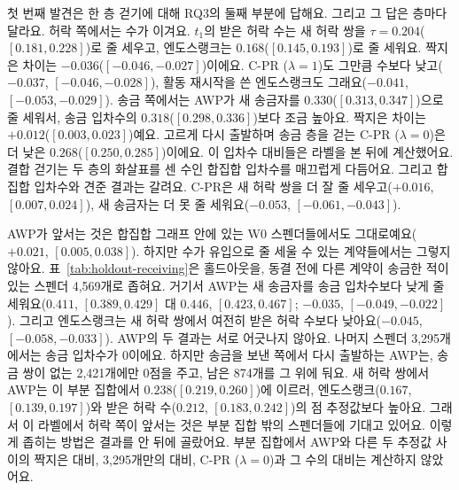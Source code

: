 첫 번째 발견은 한 층 걷기에 대해 RQ3의 둘째 부분에 답해요. 그리고 그 답은 층마다 달라요. 허락 쪽에서는 수가 이겨요. $t_1$의 받은 허락 수는 새 허락 쌍을 $\tau=0.204$($[0.181,0.228]$)로 줄 세우고, 엔도스랭크는 $0.168$($[0.145,0.193]$)로 줄 세워요. 짝지은 차이는 $-0.036$($[-0.046,-0.027]$)이에요. \mbox{C-PR} ($\lambda=1$)도 그만큼 수보다 낮고($-0.037$, $[-0.046,-0.028]$), 활동 재시작을 쓴 엔도스랭크도 그래요($-0.041$, $[-0.053,-0.029]$). 송금 쪽에서는 AWP가 새 송금자를 $0.330$($[0.313,0.347]$)으로 줄 세워서, 송금 입차수의 $0.318$($[0.298,0.336]$)보다 조금 높아요. 짝지은 차이는 $+0.012$($[0.003,0.023]$)예요. 고르게 다시 출발하며 송금 층을 걷는 \mbox{C-PR} ($\lambda=0$)은 더 낮은 $0.268$($[0.250,0.285]$)이에요. 이 입차수 대비들은 라벨을 본 뒤에 계산했어요. 결합 걷기는 두 층의 화살표를 센 수인 합집합 입차수를 매끄럽게 다듬어요. 그리고 합집합 입차수와 견준 결과는 갈려요. \mbox{C-PR}은 새 허락 쌍을 더 잘 줄 세우고($+0.016$, $[0.007,0.024]$), 새 송금자는 더 못 줄 세워요($-0.053$, $[-0.061,-0.043]$).

AWP가 앞서는 것은 합집합 그래프 안에 있는 W0 스펜더들에서도 그대로예요($+0.021$, $[0.005,0.038]$). 하지만 수가 유입으로 줄 세울 수 있는 계약들에서는 그렇지 않아요. 표~\ref{tab:holdout-receiving}은 홀드아웃을, 동결 전에 다른 계약이 송금한 적이 있는 스펜더 4,569개로 좁혀요. 거기서 AWP는 새 송금자를 송금 입차수보다 낮게 줄 세워요($0.411$, $[0.389,0.429]$ 대 $0.446$, $[0.423,0.467]$; $-0.035$, $[-0.049,-0.022]$). 그리고 엔도스랭크는 새 허락 쌍에서 여전히 받은 허락 수보다 낮아요($-0.045$, $[-0.058,-0.033]$). AWP의 두 결과는 서로 어긋나지 않아요. 나머지 스펜더 3,295개에서는 송금 입차수가 0이에요. 하지만 송금을 보낸 쪽에서 다시 출발하는 AWP는, 송금 쌍이 없는 2,421개에만 0점을 주고, 남은 874개를 그 위에 둬요. 새 허락 쌍에서 AWP는 이 부분 집합에서 $0.238$($[0.219,0.260]$)에 이르러, 엔도스랭크($0.167$, $[0.139,0.197]$)와 받은 허락 수($0.212$, $[0.183,0.242]$)의 점 추정값보다 높아요. 그래서 이 라벨에서 허락 쪽이 앞서는 것은 부분 집합 밖의 스펜더들에 기대고 있어요. 이렇게 좁히는 방법은 결과를 안 뒤에 골랐어요. 부분 집합에서 AWP와 다른 두 추정값 사이의 짝지은 대비, 3,295개만의 대비, \mbox{C-PR} ($\lambda=0$)과 그 수의 대비는 계산하지 않았어요.



